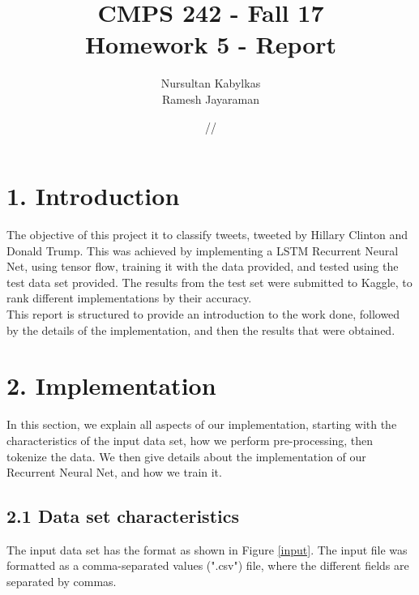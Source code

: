 \documentclass[12pt]{report}
\title{\textbf{CMPS 242 - Fall 17 \\Homework 5 - Report\\ }}
\author{Nursultan Kabylkas\\ Ramesh Jayaraman \\}
\date{\oldstylenums{11}/\oldstylenums{17}/\oldstylenums{2017}}
\begin{document}
\maketitle

\pagebreak
 
\section*{1. Introduction} 


The objective of this project it to classify tweets, tweeted by Hillary Clinton and Donald Trump. This was achieved by implementing a LSTM Recurrent Neural Net, using tensor flow, training it with the data provided, and tested using the test data set provided. The results from the test set were submitted to Kaggle, to rank different implementations by their accuracy.\\

	This report is structured to provide an introduction to the work done, followed by the details of the implementation, and then the results that were obtained. 	

\section*{2. Implementation}


In this section, we explain all aspects of our implementation, starting with the characteristics of the input data set, how we perform pre-processing, then tokenize the data. We then give details about the implementation of our Recurrent Neural Net, and how we train it.

\subsection*{2.1 Data set characteristics}

The input data set has the format as shown in Figure \ref{input}. The input file was formatted as a comma-separated values (".csv") file, where the different fields are separated by commas. 
\end{document}
